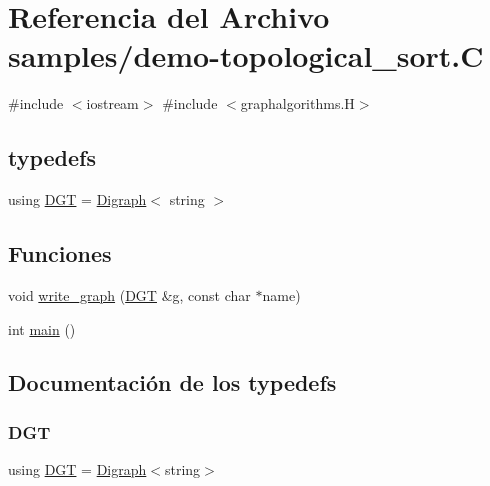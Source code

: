 \hypertarget{demo-topological__sort_8_c}{}\section{Referencia del Archivo samples/demo-\/topological\+\_\+sort.C}
\label{demo-topological__sort_8_c}
{\ttfamily \#include $<$iostream$>$}\newline
{\ttfamily \#include $<$graphalgorithms.\+H$>$}\newline
\subsection*{typedefs}
\begin{DoxyCompactItemize}
\item 
using \hyperlink{demo-topological__sort_8_c_a8f123599e859454680bf37e203c0b18b}{D\+GT} = \hyperlink{class_designar_1_1_digraph}{Digraph}$<$ string $>$
\end{DoxyCompactItemize}
\subsection*{Funciones}
\begin{DoxyCompactItemize}
\item 
void \hyperlink{demo-topological__sort_8_c_ab82a33da73b0e5278780967809b0791d}{write\+\_\+graph} (\hyperlink{demo-buildgraph_8_c_ae73e956c2a8cf0a58255aa6b659985e0}{D\+GT} \&g, const char $\ast$name)
\item 
int \hyperlink{demo-topological__sort_8_c_ae66f6b31b5ad750f1fe042a706a4e3d4}{main} ()
\end{DoxyCompactItemize}


\subsection{Documentación de los \textquotesingle{}typedefs\textquotesingle{}}
\mbox{\label{demo-topological__sort_8_c_a8f123599e859454680bf37e203c0b18b}} 
\subsubsection{\texorpdfstring{D\+GT}{DGT}}
{\footnotesize\ttfamily using \hyperlink{demo-buildgraph_8_c_ae73e956c2a8cf0a58255aa6b659985e0}{D\+GT} =  \hyperlink{class_designar_1_1_digraph}{Digraph}$<$string$>$}



